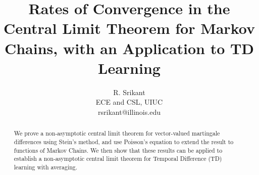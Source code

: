 \documentclass[11pt]{article}
\begin{document}



\title{Rates of Convergence in the Central Limit Theorem for Markov
Chains, with an Application to TD Learning}


\author{R. Srikant\\ECE and CSL, UIUC\\{rsrikant@illinois.edu}}


\maketitle

\begin{abstract}
     We prove a non-asymptotic central limit theorem for vector-valued martingale differences using Stein's method, and use Poisson's equation to extend the result to functions of Markov Chains. We then show that these results can be applied to establish a non-asymptotic central limit theorem for Temporal Difference (TD) learning with averaging.
\end{abstract}
\end{document}
